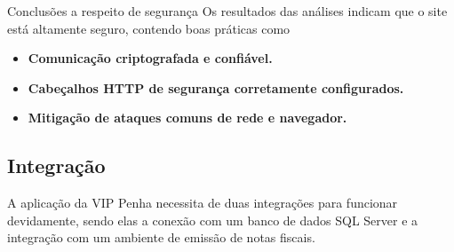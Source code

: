 \documentclass[
	12pt,				%
	openany,			%
	twoside,			%
	a4paper,			%
	english,			%
	brazil				%
	]{abntex2}
\begin{document}
Conclusões a respeito de segurança
Os resultados das análises indicam que o site está altamente seguro, contendo boas práticas como
\begin{itemize}
 \item \textbf{Comunicação criptografada e confiável.}
 \item \textbf{Cabeçalhos HTTP de segurança corretamente configurados.}
 \item \textbf{Mitigação de ataques comuns de rede e navegador.}
\end{itemize}

\subsection{Integração}

A aplicação da VIP Penha necessita de duas integrações para funcionar devidamente, sendo elas a conexão com um banco de dados SQL Server e a integração com um ambiente de emissão de notas fiscais.
\end{document}
